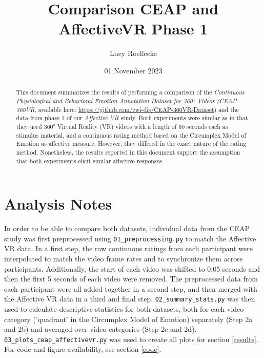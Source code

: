 \documentclass[11pt, letterpaper]{article}
\title{Comparison CEAP and AffectiveVR Phase 1}
\author{Lucy Roellecke}
\date{01 November 2023}
\begin{document}
\maketitle

\begin{abstract}
This document summarizes the results of performing a comparison of the \textit{Continuous Physiological and Behavioral Emotion Annotation Dataset for 360° Videos (CEAP-360VR}, available here: \url{https://github.com/cwi-dis/CEAP-360VR-Dataset}) and the data from phase 1 of our \textit{Affective VR} study. Both experiments were similar as in that they used 360° Virtual Reality (VR) videos with a length of 60 seconds each as stimulus material, and a continuous rating method based on the Circumplex Model of Emotion as affective measure. However, they differed in the exact nature of the rating method. Nonetheless, the results reported in this document support the assumption that both experiments elicit similar affective responses.
\end{abstract}

\newpage

\section{Analysis Notes}
In order to be able to compare both datasets, individual data from the CEAP study was first preprocessed using \verb|01_preprocessing.py| to match the Affective VR data. In a first step, the raw continuous ratings from each participant were interpolated to match the video frame rates and to synchronize them across participants. Additionally, the start of each video was shifted to 0.05 seconds and then the first 5 seconds of each video were removed. The preprocessed data from each participant were all added together in a second step, and then merged with the Affective VR data in a third and final step. \verb|02_summary_stats.py| was then used to calculate descriptive statistics for both datasets, both for each video category ('quadrant' in the Circumplex Model of Emotion) separately (Step 2a and 2b) and averaged over video categories (Step 2c and 2d). \verb|03_plots_ceap_affectivevr.py| was used to create all plots for section \ref{results}. For code and figure availability, see section \ref{code}.
\end{document}
